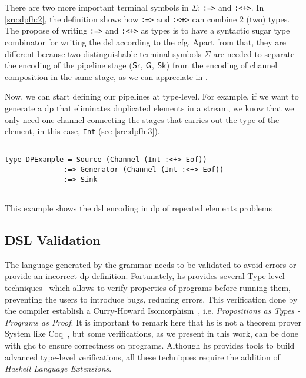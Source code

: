 There are two more important terminal symbols in $\Sigma$: \texttt{:=>} and \texttt{:<+>}.
In \autoref{src:dpfh:2}, the definition shows how \texttt{:=>} and \texttt{:<+>} can combine 2 (two) types. 
The propose of writing \texttt{:=>} and \texttt{:<+>} as types is to have a syntactic sugar type combinator for writing the \acrshort{dsl} according to the \acrshort{cfg}. 
Apart from that, they are different because two distinguishable terminal symbols $\Sigma$ are needed to separate the encoding of the pipeline stage ($\mathsf{Sr}$, $\mathsf{G}$, $\mathsf{Sk}$)
from the encoding of channel composition in the same stage, as we can appreciate in .

Now, we can start defining our pipelines at type-level. For example, if we want to generate a \acrshort{dp} that eliminates duplicated elements in a stream, we know that we only need one channel connecting the stages that carries out the type of the element, in this case, \texttt{Int} (see \autoref{src:dpfh:3}).

\begin{listing}[htp!]
  \begin{verbatim}

type DPExample = Source (Channel (Int :<+> Eof)) 
              :=> Generator (Channel (Int :<+> Eof)) 
              :=> Sink
   
  \end{verbatim}
  \caption[{[\texttt{Repeated.hs} Example of \acrshort{dp} encoded in $G_{dsl}$}]{This example shows the \acrshort{dsl} encoding in \acrshort{dp} of repeated elements problems}
  \label{src:dpfh:3}
\end{listing}

\subsection{DSL Validation}\label{sub:sec:dsl-val}
The language generated by the grammar needs to be validated to avoid errors or provide an incorrect \acrshort{dp} definition.
Fortunately, \acrshort{hs} provides several Type-level techniques~\cite{type-haskell} which allows to verify properties of programs before running them, 
preventing the users to introduce bugs, reducing errors. This verification done by the compiler establish a Curry-Howard Isomorphism~\cite{curryhoward}, i.e. 
\emph{Propositions as Types - Programs as Proof}. It is important to remark here that \acrshort{hs} is not a theorem prover System like Coq~\cite{coq}, but some verifications, as we present in this work, can be done with \acrshort{ghc} to ensure correctness on programs.
Although \acrshort{hs} provides tools to build advanced type-level verifications, all these techniques require the addition of \emph{Haskell Language Extensions}.


